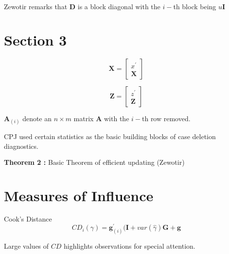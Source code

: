 \documentclass[12pt, a4paper]{article}
\begin{document}
Zewotir remarks that $\boldsymbol{D}$ is a block diagonal with the $i-$th block being $u \boldsymbol{I}$


\section{Section 3}

\[  \boldsymbol{X} = \left[  \begin{array}{c} x^{\prime} \\ \boldsymbol{X} \end{array} \right]   \]

\[  \boldsymbol{Z} = \left[  \begin{array}{c} z^{\prime} \\ \boldsymbol{Z} \end{array} \right]   \] 

$\boldsymbol{A}_{(i)}$ denote an $n\times m$ matrix $\boldsymbol{A}$ with the $i-$th row removed.


CPJ used certain statistics as the basic building blocks of case deletion diagnostics.



\textbf{Theorem 2 :} Basic Theorem of efficient updating (Zewotir)

\section{Measures of Influence}

Cook's Distance
\[  CD_{i}(\gamma) = \boldsymbol{g}^{\prime}_{(i)} ( \boldsymbol{I} + var(\hat{\gamma}) \boldsymbol{G} + \boldsymbol{g}\]

Large values of $CD$ highlights observations for special attention.
\end{document}

